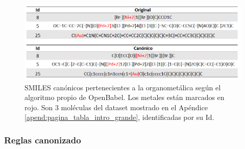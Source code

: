\begin{figure}[h!]
    \centering
    \includegraphics[scale=0.5]{imagenes/diseno/canonizado/canonicos_mal_implementacion.png}
    \caption{SMILES canónicos pertenecientes a la organometálica según el algoritmo propio de OpenBabel. Los metales están marcados en rojo. Son 3 moléculas del dataset mostrado en el Apéndice \ref{apend:pagina_tabla_intro_grande}, identificadas por su Id.} 
    \label{fig:canonicos_mal_implementacion}
\end{figure}



\subsubsection{Reglas canonizado} \label{reglas_canonizado}

